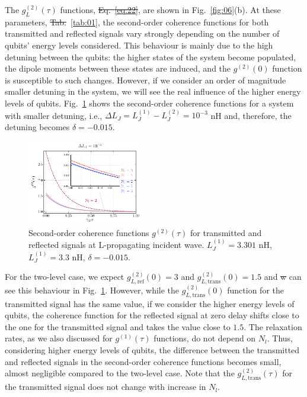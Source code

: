 \documentclass[lettersize,journal]{IEEEtran}
\providecommand{\DIFaddtex}[1]{{\protect\color{blue}\uwave{#1}}} %
\providecommand{\DIFdeltex}[1]{{\protect\color{red}\sout{#1}}}                      %
\providecommand{\DIFaddbegin}{} %
\providecommand{\DIFaddend}{} %
\providecommand{\DIFdelbegin}{} %
\providecommand{\DIFdelend}{} %
\providecommand{\DIFadd}[1]{\texorpdfstring{\DIFaddtex{#1}}{#1}} %
\providecommand{\DIFdel}[1]{\texorpdfstring{\DIFdeltex{#1}}{}} %
\newcommand{\DIFscaledelfig}{0.5}
\newlength{\DIFdelgraphicswidth} %
\newlength{\DIFdelgraphicsheight} %
\newcommand{\DIFaddincludegraphics}[2][]{{\color{blue}\fbox{\DIFOincludegraphics[#1]{#2}}}} %
\newcommand{\DIFdelincludegraphics}[2][]{%
\sbox{\DIFdelgraphicsbox}{\DIFOincludegraphics[#1]{#2}}%
\settoboxwidth{\DIFdelgraphicswidth}{\DIFdelgraphicsbox} %
\settoboxtotalheight{\DIFdelgraphicsheight}{\DIFdelgraphicsbox} %
\scalebox{\DIFscaledelfig}{%
\parbox[b]{\DIFdelgraphicswidth}{\usebox{\DIFdelgraphicsbox}\\[-\baselineskip] \rule{\DIFdelgraphicswidth}{0em}}\llap{\resizebox{\DIFdelgraphicswidth}{\DIFdelgraphicsheight}{%
\setlength{\unitlength}{\DIFdelgraphicswidth}%
\begin{picture}(1,1)%
\thicklines\linethickness{2pt} %
{\color[rgb]{1,0,0}\put(0,0){\framebox(1,1){}}}%
{\color[rgb]{1,0,0}\put(0,0){\line( 1,1){1}}}%
{\color[rgb]{1,0,0}\put(0,1){\line(1,-1){1}}}%
\end{picture}%
}\hspace*{3pt}}} %
} %
\DeclareRobustCommand{\DIFaddbegin}{\DIFOaddbegin \let\includegraphics\DIFaddincludegraphics} %
\DeclareRobustCommand{\DIFaddend}{\DIFOaddend \let\includegraphics\DIFOincludegraphics} %
\DeclareRobustCommand{\DIFdelbegin}{\DIFOdelbegin \let\includegraphics\DIFdelincludegraphics} %
\DeclareRobustCommand{\DIFdelend}{\DIFOaddend \let\includegraphics\DIFOincludegraphics} %
\begin{document}
The $g^{(2)}_L(\tau)$ functions, \DIFdelbegin \DIFdel{Eq.~\ref{eq:22}}\DIFdelend \DIFaddbegin \DIFadd{see~(\ref{eq:21})}\DIFaddend , are shown in Fig.~\ref{fig:06}(b).
At these parameters, \DIFdelbegin \DIFdel{Tab.}\DIFdelend \DIFaddbegin \DIFadd{Table}\DIFaddend ~\ref{tab:01}, the second-order coherence functions for both transmitted and reflected signals vary strongly depending on the number of qubits' energy levels considered.
This behaviour is mainly due to the high detuning between the qubits: the higher states of the system become populated, the dipole moments between these states are induced, and the $g^{(2)}(0)$ function is susceptible to such changes.
However, if we consider an order of magnitude smaller detuning in the system, we will see the real influence of the higher energy levels of qubits.
Fig.~\ref{fig:06_1} shows the second-order coherence functions for a system with smaller detuning, i.e., $\Delta L_J = L_J^{(1)} - L_J^{(2)} = 10^{-3}$ nH and, therefore, the detuning becomes $\delta = -0.015$.
\begin{figure}[h]
    \centering
    \includegraphics[width=0.45\textwidth]{fig_4_1}
    \caption{Second-order coherence functions $g^{(2)}(\tau)$ for transmitted and reflected signals at L-propagating incident wave. $L_J^{(1)} = 3.301$ nH, $L_J^{(1)} = 3.3$ nH, $\delta = -0.015$.}
    \label{fig:06_1}
\end{figure}
For the two-level case, we expect $g^{(2)}_{L, \mathrm{ref}}(0) = 3$ and $g^{(2)}_{L, \mathrm{trans}}(0) = 1.5$ and \DIFdelbegin \DIFdel{w }\DIFdelend \DIFaddbegin \DIFadd{we }\DIFaddend can see this behaviour in Fig.~\ref{fig:06_1}.
However, while the $g^{(2)}_{L, \mathrm{trans}}(0)$ function for the transmitted signal has the same value, if we consider the higher energy levels of qubits, the coherence function for the reflected signal at zero delay shifts close to the one for the transmitted signal and takes the value close to $1.5$.
The relaxation rates, as we also discussed for $g^{(1)}(\tau)$ functions, do not depend on $N_l$.
Thus, considering higher energy levels of qubits, the difference between the transmitted and reflected signals in the second-order coherence functions becomes small, almost negligible compared to the two-level case.
Note that the $g^{(2)}_{L, \mathrm{trans}}(\tau)$ for the transmitted signal does not change with increase in $N_l$.
\end{document}
